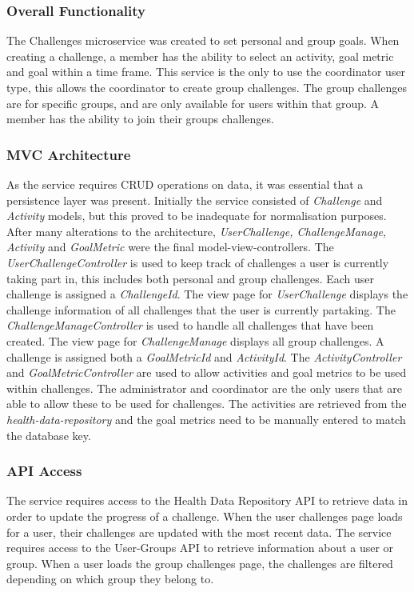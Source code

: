 \subsubsection{Overall Functionality}
\par
The Challenges microservice was created to set personal and group goals. When creating a challenge, a member has the ability to select an activity, goal metric and goal within a time frame. This service is the only to use the coordinator user type, this allows the coordinator to create group challenges. The group challenges are for specific groups, and are only available for users within that group. A member has the ability to join their groups challenges.
\subsubsection{MVC Architecture}
\par
As the service requires CRUD operations on data, it was essential that a persistence layer was present.
Initially the service consisted of \textit{Challenge} and \textit{Activity} models, but this proved to be inadequate for normalisation purposes. After many alterations to the architecture, \textit{UserChallenge, ChallengeManage, Activity} and \textit{GoalMetric} were the final model-view-controllers. 
The \textit{UserChallengeController} is used to keep track of challenges a user is currently taking part in, this includes both personal and group challenges. Each user challenge is assigned a \textit{ChallengeId}. The view page for \textit{UserChallenge} displays the challenge information of all challenges that the user is currently partaking. 
The \textit{ChallengeManageController} is used to handle all challenges that have been created. The view page for \textit{ChallengeManage} displays all group challenges. A challenge is assigned both a \textit{GoalMetricId} and \textit{ActivityId}.
The \textit{ActivityController}  and \textit{GoalMetricController} are used to allow activities and goal metrics to be used within challenges. The administrator and coordinator are the only users that are able to allow these to be used for challenges. The activities are retrieved from the \textit{health-data-repository} and the goal metrics need to be manually entered to match the database key. 


\subsubsection{API Access}
\par
The service requires access to the Health Data Repository API to retrieve data in order to update the progress of a challenge. When the user challenges page loads for a user, their challenges are updated with the most recent data.
The service requires access to the User-Groups API to retrieve information about a user or group. When a user loads the group challenges page, the challenges are filtered depending on which group they belong to.

